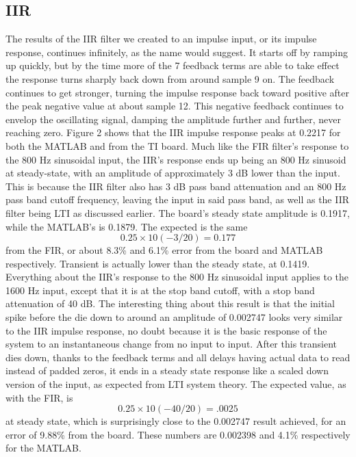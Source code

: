 \documentclass{bannerReport}
\begin{document}
\subsection{IIR}
The results of the IIR filter we created to an impulse input, or its impulse response, continues infinitely, as the name would suggest. It starts off by ramping up quickly, but by the time more of the 7 feedback terms are able to take effect the response turns sharply back down from around sample 9 on. The feedback continues to get stronger, turning the impulse response back toward positive after the peak negative value at about sample 12. This negative feedback continues to envelop the oscillating signal, damping the amplitude further and further, never reaching zero. Figure 2 shows that the IIR impulse response peaks at 0.2217 for both the MATLAB and from the TI board.
Much like the FIR filter’s response to the 800 Hz sinusoidal input, the IIR’s response ends up being an 800 Hz sinusoid at steady-state, with an amplitude of approximately 3 dB lower than the input. This is because the IIR filter also has 3 dB pass band attenuation and an 800 Hz pass band cutoff frequency, leaving the input in said pass band, as well as the IIR filter being LTI as discussed earlier. The board’s steady state amplitude is 0.1917, while the MATLAB’s is 0.1879. The expected is the same $$0.25\times10(-3/20) = 0.177$$ from the FIR, or about 8.3\% and 6.1\% error from the board and MATLAB respectively. Transient is actually lower than the steady state, at 0.1419.
Everything about the IIR’s response to the 800 Hz sinusoidal input applies to the 1600 Hz input, except that it is at the stop band cutoff, with a stop band attenuation of 40 dB. The interesting thing about this result is that the initial spike before the die down to around an amplitude of 0.002747 looks very similar to the IIR impulse response, no doubt because it is the basic response of the system to an instantaneous change from no input to input. After this transient dies down, thanks to the feedback terms and all delays having actual data to read instead of padded zeros, it ends in a steady state response like a scaled down version of the input, as expected from LTI system theory. The expected value, as with the FIR, is $$0.25\times10(-40/20) = .0025$$ at steady state, which is surprisingly close to the 0.002747 result achieved, for an error of 9.88\% from the board. These numbers are 0.002398 and 4.1\% respectively for the MATLAB.
\end{document}
